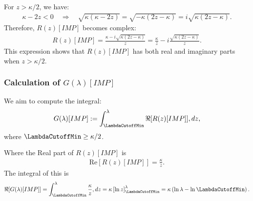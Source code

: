 For $z > \kappa/2$, we have:
\begin{align}
\kappa - 2z < 0 \quad \Rightarrow \quad \sqrt{\kappa(\kappa - 2z)} = \sqrt{-\kappa(2z - \kappa)} = i \sqrt{\kappa(2z - \kappa)}.
\end{align}
%
Therefore, $R(z)[IMP]$ becomes complex:
\begin{align}
R(z)[IMP] = \frac{\kappa - i \sqrt{\kappa(2z - \kappa)}}{z} = \frac{\kappa}{z} - i \frac{ \sqrt{ \kappa(2z - \kappa) } }{ z }.
\end{align}
%
This expression shows that $R(z)[IMP]$ has both real and imaginary parts when $z > \kappa/2$.

\subsubsection{Calculation of $G(\lambda)[IMP]$}

We aim to compute the integral:
\begin{align}
G(\lambda)[IMP] := \int_{\LambdaCutoffMin}^\lambda \Re[R(z)[IMP]] , dz,
\end{align}
where $\LambdaCutoffMin \geq \kappa/2$.

Where the Real part of $R(z)[IMP]$ is
\begin{align}
\text{Re}[R(z)[IMP]] = \frac{\kappa}{z}.
\end{align}
%
The integral of this is
\begin{align}
\Re[G(\lambda)[IMP]] = \int_{\LambdaCutoffMin}^\lambda \frac{\kappa}{z} , dz = \kappa \left[ \ln z \right]_{\LambdaCutoffMin}^\lambda = \kappa \left( \ln \lambda - \ln \LambdaCutoffMin \right).
\end{align}




